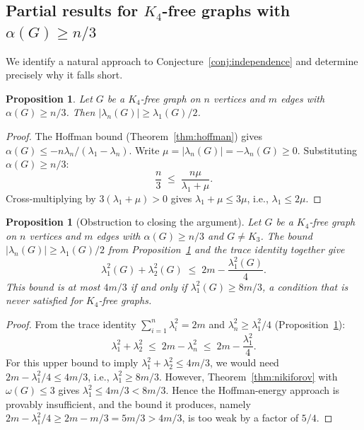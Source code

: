 \documentclass[preprint,12pt]{elsarticle}
\theoremstyle{plain}
\newtheorem{proposition}[theorem]{Proposition}
\theoremstyle{definition}
\begin{document}
\subsection{Partial results for $K_4$-free graphs with $\alpha(G) \geq n/3$}
\label{ssec:independence}

We identify a natural approach to Conjecture~\ref{conj:independence}
and determine precisely why it falls short.

\begin{proposition}
  \label{prop:hoffman}
  Let $G$ be a $K_4$-free graph on $n$ vertices and $m$ edges with
  $\alpha(G) \geq n/3$.  Then $|\lambda_n(G)| \geq \lambda_1(G)/2$.
\end{proposition}

\begin{proof}
The Hoffman bound (Theorem~\ref{thm:hoffman}) gives
$\alpha(G) \leq -n\lambda_n/(\lambda_1 - \lambda_n)$.
Write $\mu = |\lambda_n(G)| = -\lambda_n(G) \geq 0$.
Substituting $\alpha(G) \geq n/3$:
\[
  \frac{n}{3}
  \;\leq\; \frac{n\mu}{\lambda_1 + \mu}.
\]
Cross-multiplying by $3(\lambda_1 + \mu) > 0$ gives
$\lambda_1 + \mu \leq 3\mu$, i.e., $\lambda_1 \leq 2\mu$.
\end{proof}

\begin{proposition}[Obstruction to closing the argument]
  \label{prop:obstruction}
  Let $G$ be a $K_4$-free graph on $n$ vertices and $m$ edges with
  $\alpha(G) \geq n/3$ and $G \neq K_3$.
  The bound $|\lambda_n(G)| \geq \lambda_1(G)/2$ from
  Proposition~\ref{prop:hoffman} and the trace identity together give
  \[
    \lambda_1^2(G) + \lambda_2^2(G)
    \;\leq\; 2m - \frac{\lambda_1^2(G)}{4}.
  \]
  This bound is at most $4m/3$ if and only if $\lambda_1^2(G) \geq 8m/3$,
  a condition that is never satisfied for $K_4$-free graphs.
\end{proposition}

\begin{proof}
From the trace identity $\sum_{i=1}^n \lambda_i^2 = 2m$ and
$\lambda_n^2 \geq \lambda_1^2/4$ (Proposition~\ref{prop:hoffman}):
\[
  \lambda_1^2 + \lambda_2^2
  \;\leq\; 2m - \lambda_n^2
  \;\leq\; 2m - \frac{\lambda_1^2}{4}.
\]
For this upper bound to imply $\lambda_1^2 + \lambda_2^2 \leq 4m/3$, we would
need $2m - \lambda_1^2/4 \leq 4m/3$, i.e., $\lambda_1^2 \geq 8m/3$.
However, Theorem~\ref{thm:nikiforov} with $\omega(G) \leq 3$ gives
$\lambda_1^2 \leq 4m/3 < 8m/3$.
Hence the Hoffman-energy approach is provably insufficient, and the
bound it produces, namely $2m - \lambda_1^2/4 \geq 2m - m/3 = 5m/3 > 4m/3$,
is too weak by a factor of $5/4$.
\end{proof}
\end{document}
